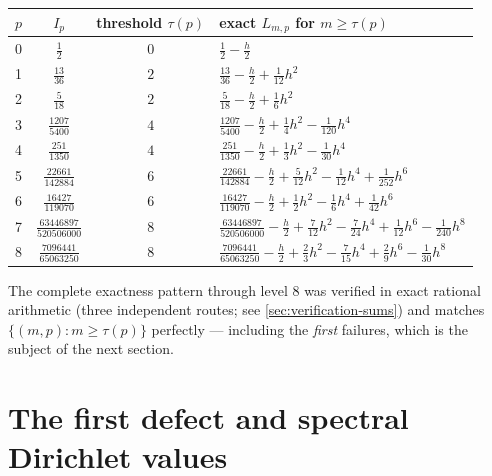 \documentclass[11pt,oneside]{article}
\numberwithin{equation}{section}
\theoremstyle{definition}
\theoremstyle{remark}
\begin{document}
\begin{center}
\small
\begin{tabular}{c c c l}
\toprule
$p$ & $I_p$ & threshold $\tau(p)$ & exact $L_{m,p}$ for $m\ge\tau(p)$ \\
\midrule
0 & $\frac{1}{2}$ & $0$ & $\frac{1}{2}-\frac{h}{2}$ \\
1 & $\frac{13}{36}$ & $2$ & $\frac{13}{36}-\frac{h}{2}+\frac{1}{12}h^{2}$ \\
2 & $\frac{5}{18}$ & $2$ & $\frac{5}{18}-\frac{h}{2}+\frac{1}{6}h^{2}$ \\
3 & $\frac{1207}{5400}$ & $4$ & $\frac{1207}{5400}-\frac{h}{2}+\frac{1}{4}h^{2}-\frac{1}{120}h^{4}$ \\
4 & $\frac{251}{1350}$ & $4$ & $\frac{251}{1350}-\frac{h}{2}+\frac{1}{3}h^{2}-\frac{1}{30}h^{4}$ \\
5 & $\frac{22661}{142884}$ & $6$ & $\frac{22661}{142884}-\frac{h}{2}+\frac{5}{12}h^{2}-\frac{1}{12}h^{4}+\frac{1}{252}h^{6}$ \\
6 & $\frac{16427}{119070}$ & $6$ & $\frac{16427}{119070}-\frac{h}{2}+\frac{1}{2}h^{2}-\frac{1}{6}h^{4}+\frac{1}{42}h^{6}$ \\
7 & $\frac{63446897}{520506000}$ & $8$ & $\frac{63446897}{520506000}-\frac{h}{2}+\frac{7}{12}h^{2}-\frac{7}{24}h^{4}+\frac{1}{12}h^{6}-\frac{1}{240}h^{8}$ \\
8 & $\frac{7096441}{65063250}$ & $8$ & $\frac{7096441}{65063250}-\frac{h}{2}+\frac{2}{3}h^{2}-\frac{7}{15}h^{4}+\frac{2}{9}h^{6}-\frac{1}{30}h^{8}$ \\
\bottomrule
\end{tabular}
\label{tab:integer-closed}
\end{center}

The complete exactness pattern through level $8$ was verified in exact
rational arithmetic (three independent routes; see
\cref{sec:verification-sums}) and matches
$\{(m,p):m\ge\tau(p)\}$ perfectly --- including the \emph{first}
failures, which is the subject of the next section.

\section{The first defect and spectral Dirichlet values}
\label{sec:dirichlet}
\end{document}
